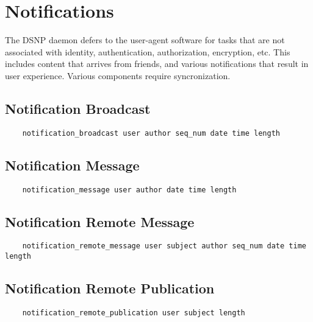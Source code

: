 \documentclass[letterpaper,11pt,oneside]{article}
\begin{document}
\section{Notifications}

The DSNP daemon defers to the user-agent software for tasks that are not
associated with identity, authentication, authorization, encryption, etc. This
includes content that arrives from friends, and various notifications that
result in user experience. Various components require syncronization.

\subsection{Notification Broadcast}

\vspace{10pt}
\begin{verbatim}
    notification_broadcast user author seq_num date time length 
\end{verbatim}
\vspace{10pt}

\subsection{Notification Message}

\vspace{10pt}
\begin{verbatim}
    notification_message user author date time length 
\end{verbatim}
\vspace{10pt}

\subsection{Notification Remote Message}

\vspace{10pt}
\begin{verbatim}
    notification_remote_message user subject author seq_num date time length 
\end{verbatim}
\vspace{10pt}

\subsection{Notification Remote Publication}

\vspace{10pt}
\begin{verbatim}
    notification_remote_publication user subject length 
\end{verbatim}
\vspace{10pt}
\end{document}
